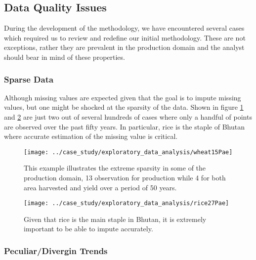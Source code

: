 \documentclass[nojss]{jss}\usepackage[]{graphicx}\usepackage[]{color}
\begin{document}
\FloatBarrier
\subsection{Data Quality Issues}
During the development of the methodology, we have encountered several
cases which required us to review and redefine our initial
methodology. These are not exceptions, rather they are prevalent in
the production domain and the analyst should bear in mind of these
properties.


\subsubsection{Sparse Data}
Although missing values are expected given that the goal is to impute
missing values, but one might be shocked at the sparsity of the
data. Shown in figure \ref{fig:wheatBotswana} and \ref{fig:riceBhutan}
are just two out of several hundreds of cases where only a handful of
points are observed over the past fifty years. In particular, rice is
the staple of Bhutan where accurate estimation of the missing value is
critical.

\begin{figure}[!ht]
  \centering
  \texttt{[image: ../case\_study/exploratory\_data\_analysis/wheat15Pae]}
 \caption{This example illustrates the extreme sparsity in some of the
   production domain, 13 observation for production while 4 for both
   area harvested and yield over a period of 50 years.}
  \label{fig:wheatBotswana} 
\end{figure}

\begin{figure}[!ht]
  \centering
  \texttt{[image: ../case\_study/exploratory\_data\_analysis/rice27Pae]}
  \caption{Given that rice is the main staple in Bhutan, it is
    extremely important to be able to impute accurately.}
  \label{fig:riceBhutan}  
\end{figure}

\FloatBarrier
\subsubsection{Peculiar/Divergin Trends}

\end{document}
